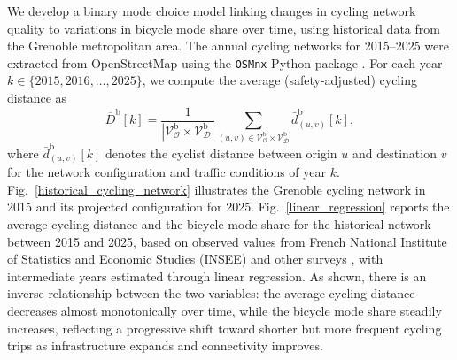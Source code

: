\documentclass[lettersize,journal]{IEEEtran}
\begin{document}
We develop a binary mode choice model linking changes in cycling network quality to variations in bicycle mode share over time, using historical data from the Grenoble metropolitan area.  
The annual cycling networks for 2015--2025 were extracted from OpenStreetMap using the \texttt{OSMnx} Python package \cite{boeing2017}.  
For each year $k \in \{2015, 2016, \ldots, 2025\}$, we compute the average (safety-adjusted) cycling distance as
\begin{equation}
    \overline{D}^\mathrm{b}[k] =
    \frac{1}{|\mathcal{V}_{\mathcal{O}}^\mathrm{b} \times \mathcal{V}_{\mathcal{D}}^\mathrm{b}|}
    \sum_{(u,v) \in \mathcal{V}_{\mathcal{O}}^\mathrm{b} \times \mathcal{V}_{\mathcal{D}}^\mathrm{b}}
    \bar{d}_{(u,v)}^\mathrm{b}[k],
\end{equation}
where $\bar{d}_{(u,v)}^\mathrm{b}[k]$ denotes the cyclist distance between origin $u$ and destination $v$ for the network configuration and traffic conditions of year $k$. Fig.~\ref{historical_cycling_network} illustrates the Grenoble cycling network in 2015 and its projected configuration for 2025.
Fig.~\ref{linear_regression} reports the average cycling distance and the bicycle mode share for the historical network between 2015 and 2025, based on observed values from French National Institute of Statistics and
Economic Studies (INSEE) and other surveys \cite{aller2017, aurg2020, cie2024}, with intermediate years estimated through linear regression.
As shown, there is an inverse relationship between the two variables: the average cycling distance decreases almost monotonically over time, while the bicycle mode share steadily increases, reflecting a progressive shift toward shorter but more frequent cycling trips as infrastructure expands and connectivity improves.
\end{document}
